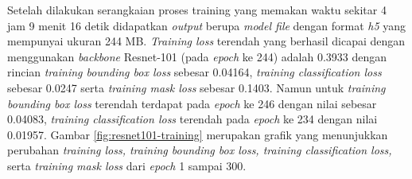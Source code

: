 Setelah dilakukan serangkaian proses training yang memakan waktu sekitar 4 jam 9 menit 16 detik didapatkan \textit{output} berupa \textit{model file}  dengan format \textit{h5} yang mempunyai ukuran 244 MB. \textit{Training loss} terendah yang berhasil dicapai dengan menggunakan \textit{backbone} Resnet-101 (pada \textit{epoch} ke 244) adalah 0.3933 dengan rincian \textit{training bounding box loss} sebesar 0.04164, \textit{training classification loss} sebesar 0.0247 serta \textit{training mask loss} sebesar 0.1403. Namun untuk \textit{training bounding box loss} terendah terdapat pada \textit{epoch} ke 246 dengan nilai sebesar 0.04083, \textit{training classification loss} terendah pada \textit{epoch} ke 234 dengan nilai 0.01957. Gambar \ref{fig:resnet101-training} merupakan grafik yang menunjukkan perubahan \textit{training loss, training bounding box loss, training classification loss,} serta \textit{training mask loss} dari \textit{epoch} 1 sampai 300. 

